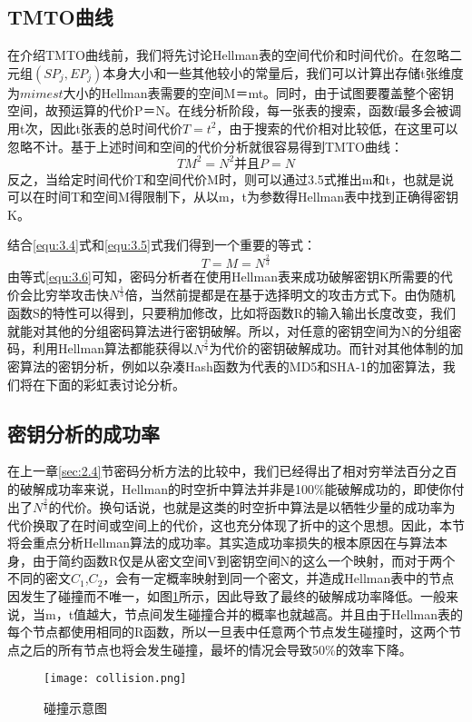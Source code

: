 	\subsection{TMTO曲线}
在介绍TMTO曲线前，我们将先讨论Hellman表的空间代价和时间代价。在忽略二元组$(SP_j,EP_j)$本身大小和一些其他较小的常量后，我们可以计算出存储t张维度为$m	imes t$大小的Hellman表需要的空间M＝mt。同时，由于试图要覆盖整个密钥空间，故预运算的代价P＝N。在线分析阶段，每一张表的搜索，函数f最多会被调用t次，因此t张表的总时间代价$T=t^2$，由于搜索的代价相对比较低，在这里可以忽略不计。基于上述时间和空间的代价分析就很容易得到TMTO曲线：
\begin{equation}TM^2=N^2\text{并且} P=N
\label{equ:3.5}
\end{equation}
反之，当给定时间代价T和空间代价M时，则可以通过3.5式推出m和t，也就是说可以在时间T和空间M得限制下，从以m，t为参数得Hellman表中找到正确得密钥K。

结合\eqref{equ:3.4}式和\eqref{equ:3.5}式我们得到一个重要的等式：
\begin{equation}T=M=N^{\tfrac{2}{3}}
\label{equ:3.6}
\end{equation}
由等式\eqref{equ:3.6}可知，密码分析者在使用Hellman表来成功破解密钥K所需要的代价会比穷举攻击快$N^{\tfrac{1}{3}}$倍，当然前提都是在基于选择明文的攻击方式下。由伪随机函数S的特性可以得到，只要稍加修改，比如将函数R的输入输出长度改变，我们就能对其他的分组密码算法进行密钥破解。所以，对任意的密钥空间为N的分组密码，利用Hellman算法都能获得以$N^{\tfrac{2}{3}}$为代价的密钥破解成功。而针对其他体制的加密算法的密钥分析，例如以杂凑Hash函数为代表的MD5和SHA-1的加密算法，我们将在下面的彩虹表讨论分析。
	\subsection{密钥分析的成功率}
在上一章\ref{sec:2.4}节密码分析方法的比较中，我们已经得出了相对穷举法百分之百的破解成功率来说，Hellman的时空折中算法并非是100\%能破解成功的，即使你付出了$N^{\tfrac{2}{3}}$的代价。换句话说，也就是这类的时空折中算法是以牺牲少量的成功率为代价换取了在时间或空间上的代价，这也充分体现了折中的这个思想。因此，本节将会重点分析Hellman算法的成功率。其实造成功率损失的根本原因在与算法本身，由于简约函数R仅是从密文空间V到密钥空间N的这么一个映射，而对于两个不同的密文$C_1$,$C_2$，会有一定概率映射到同一个密文，并造成Hellman表中的节点因发生了碰撞而不唯一，如图\ref{fig:3.1}所示，因此导致了最终的破解成功率降低。一般来说，当m，t值越大，节点间发生碰撞合并的概率也就越高。并且由于Hellman表的每个节点都使用相同的R函数，所以一旦表中任意两个节点发生碰撞时，这两个节点之后的所有节点也将会发生碰撞，最坏的情况会导致50\%的效率下降。
\begin{figure}[!ht]
\centering
\texttt{[image: collision.png]}
\caption{碰撞示意图}
\label{fig:3.1}
\end{figure}

